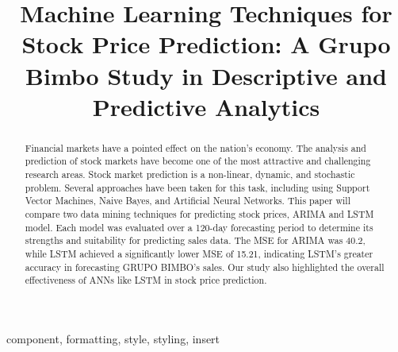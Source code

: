 \documentclass[conference]{IEEEtran}
\begin{document}
\title{Machine Learning Techniques for Stock Price Prediction: A Grupo Bimbo Study in Descriptive and Predictive Analytics \\


}

\author{
\and
{}
}

\maketitle

\begin{abstract}
Financial markets have a pointed effect on the nation's economy. The analysis and prediction of stock markets have become one of the most attractive and challenging research areas. Stock market prediction is a non-linear, dynamic, and stochastic problem. Several approaches have been taken for this task, including using Support Vector Machines, Naive Bayes, and Artificial Neural Networks. This paper will compare two data mining techniques for predicting stock prices, ARIMA and LSTM model. Each model was evaluated over a 120-day forecasting period to determine its strengths and suitability for predicting sales data. The MSE for ARIMA was 40.2, while LSTM achieved a significantly lower MSE of 15.21, indicating LSTM’s greater accuracy in forecasting GRUPO BIMBO’s sales. Our study also highlighted the overall effectiveness of ANNs like LSTM in stock price prediction.

\end{abstract}

\begin{IEEEkeywords}
component, formatting, style, styling, insert
\end{IEEEkeywords}
\end{document}
